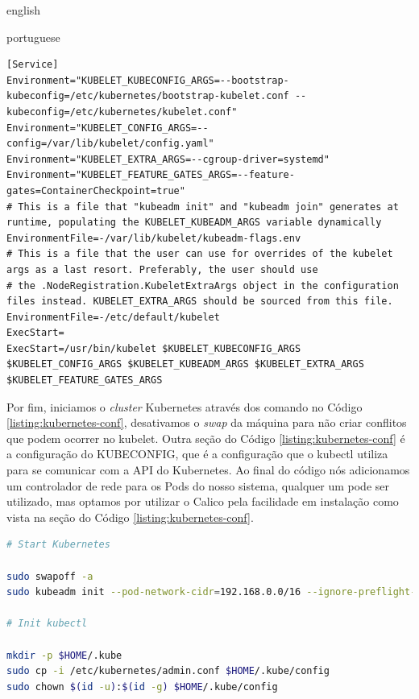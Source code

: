 \begin{otherlanguage*}{english}
\begin{otherlanguage*}{portuguese}
\begin{lstlisting}[language=plaintext,caption={Configuração do kubelet para executar no systemd com Feature Flag de ContainerCheckpoint e cgroup do systemd.},label={listing:kubelet-conf}]
[Service]
Environment="KUBELET_KUBECONFIG_ARGS=--bootstrap-kubeconfig=/etc/kubernetes/bootstrap-kubelet.conf --kubeconfig=/etc/kubernetes/kubelet.conf"
Environment="KUBELET_CONFIG_ARGS=--config=/var/lib/kubelet/config.yaml"
Environment="KUBELET_EXTRA_ARGS=--cgroup-driver=systemd"
Environment="KUBELET_FEATURE_GATES_ARGS=--feature-gates=ContainerCheckpoint=true"
# This is a file that "kubeadm init" and "kubeadm join" generates at runtime, populating the KUBELET_KUBEADM_ARGS variable dynamically
EnvironmentFile=-/var/lib/kubelet/kubeadm-flags.env
# This is a file that the user can use for overrides of the kubelet args as a last resort. Preferably, the user should use
# the .NodeRegistration.KubeletExtraArgs object in the configuration files instead. KUBELET_EXTRA_ARGS should be sourced from this file.
EnvironmentFile=-/etc/default/kubelet
ExecStart=
ExecStart=/usr/bin/kubelet $KUBELET_KUBECONFIG_ARGS $KUBELET_CONFIG_ARGS $KUBELET_KUBEADM_ARGS $KUBELET_EXTRA_ARGS $KUBELET_FEATURE_GATES_ARGS
\end{lstlisting}

Por fim, iniciamos o \textit{cluster} Kubernetes através dos comando no Código
\ref{listing:kubernetes-conf}, desativamos o \textit{swap} da máquina para não criar conflitos que podem
ocorrer no kubelet. Outra seção do Código \ref{listing:kubernetes-conf} é a configuração do
KUBECONFIG, que é a configuração que o kubectl utiliza para se comunicar com a API do Kubernetes.
Ao final do código nós adicionamos um controlador de rede para os Pods do nosso sistema, qualquer
um pode ser utilizado, mas optamos por utilizar o Calico \cite{calico} pela facilidade em
instalação como vista na seção do Código \ref{listing:kubernetes-conf}.

\begin{lstlisting}[language=bash,caption={Inicialização do Kubernetes, configuração de acesso para o kubectl e instalação do administrador de rede para Pods Calico.},label={listing:kubernetes-conf}]
# Start Kubernetes

sudo swapoff -a
sudo kubeadm init --pod-network-cidr=192.168.0.0/16 --ignore-preflight-errors='all'

# Init kubectl

mkdir -p $HOME/.kube
sudo cp -i /etc/kubernetes/admin.conf $HOME/.kube/config
sudo chown $(id -u):$(id -g) $HOME/.kube/config


\end{lstlisting}
\end{otherlanguage*}
\end{otherlanguage*}

